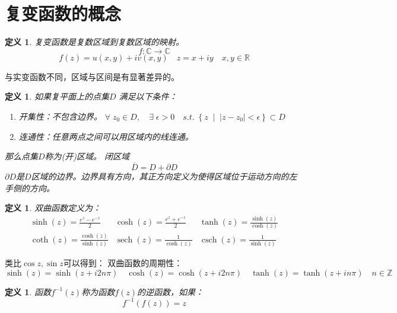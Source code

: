\documentclass[10pt, a4paper, oneside]{ctexbook}
\newtheorem{definition}[theorem]{定义}
\begin{document}
\section{复变函数的概念}
\begin{definition}
    复变函数是复数区域到复数区域的映射。
    $$f:\mathbb{C}\to \mathbb{C}$$
    $$f(z)=u(x,y)+iv(x,y)\quad z=x+iy\quad x,y\in \mathbb{R}$$
\end{definition}
与实变函数不同，{\color{red}区域}与{\color{red}区间}是有显著差异的。
\begin{definition}
    如果复平面上的点集$D$ 满足以下条件：
    \begin{enumerate}
        \item 开集性：不包含边界。 $\forall \; z_0 \in D ,\quad \exists \; \epsilon >0 \quad s.t. \; \left\{ z\;\mid\;|z-z_0|<\epsilon \right\} \subset D $
        \item 连通性：任意两点之间可以用区域内的线连通。
    \end{enumerate}
    那么点集$D$称为(开)区域。
    闭区域$$\overline{D}=D+\partial D$$
    $\partial D$是$D$区域的边界。边界具有方向，其正方向定义为使得区域位于运动方向的左手侧的方向。
\end{definition}
\begin{definition}
    双曲函数定义为：
$$
\begin{array}{lll}
\sinh (z)=\displaystyle\frac{e^{z}-e^{-z}}{2} & \cosh (z)=\displaystyle\frac{e^{z}+e^{-z}}{2} & \tanh (z)=\displaystyle\frac{\sinh (z)}{\cosh (z)} \\
\operatorname{coth}(z)=\displaystyle \frac{\cosh (z)}{\sinh (z)} & \operatorname{sech}(z)=\displaystyle \frac{1}{\cosh (z)} & \operatorname{csch}(z)=\displaystyle \frac{1}{\sinh (z)}
\end{array}
$$
\end{definition}
类比$\cos z, \sin z$可以得到：
双曲函数的周期性：
$$
\sinh (z) = \sinh (z+i2n\pi) \quad \cosh (z) = \cosh (z+i2n\pi) \quad \tanh(z)=\tanh(z+in\pi)\quad n\in\mathbb{Z}
$$
\begin{definition}
    函数$f^{-1}(z)$称为函数$f(z)$的逆函数，如果：
    $$
    f^{-1}(f(z))=z
    $$
\end{definition}
\end{document}
